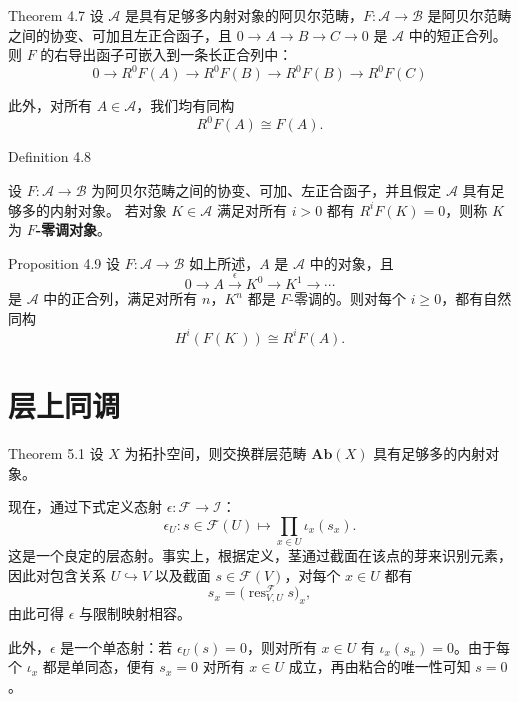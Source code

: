 \documentclass{beamer}
\begin{document}
\begin{frame}
\begin{block}{Theorem 4.7}
设 $\mathcal{A}$ 是具有足够多内射对象的阿贝尔范畴，$F: \mathcal{A} \to \mathcal{B}$ 是阿贝尔范畴之间的协变、可加且左正合函子，且 $0 \to A \to B \to C \to 0$ 是 $\mathcal{A}$ 中的短正合列。则 $F$ 的右导出函子可嵌入到一条长正合列中：
\[
0 \to R^{0} F(A) \to R^{0} F(B) \to R^{0} F(B) \to R^{0} F(C) \tag{6.12}
\]

此外，对所有 $A\in\mathcal{A}$，我们均有同构
\[
R^{0}F(A)\cong F(A).
\]
\end{block}
\end{frame}

\begin{frame}
\begin{block}{Definition 4.8}

设 $F\colon \mathcal{A}\to\mathcal{B}$ 为阿贝尔范畴之间的协变、可加、左正合函子，并且假定 $\mathcal{A}$ 具有足够多的内射对象。
若对象 $K\in\mathcal{A}$ 满足对所有 $i>0$ 都有 $R^iF(K)=0$，则称 $K$ 为 \textbf{$F$-零调对象}。

\end{block}

\begin{block}{Proposition 4.9}
设 $F:\mathcal{A}\to\mathcal{B}$ 如上所述，$A$ 是 $\mathcal{A}$ 中的对象，且
\[
0 \to A \stackrel{\epsilon}{\to} K^{0} \to K^{1} \to \cdots
\]
是 $\mathcal{A}$ 中的正合列，满足对所有 $n$，$K^{n}$ 都是 $F$-零调的。则对每个 $i\ge0$，都有自然同构
\[
H^{i}(F(K^{\cdot})) \cong R^{i}F(A).
\]
\end{block}
\end{frame}

\section{层上同调}

\begin{frame}
\begin{block}{Theorem 5.1}
设 $X$ 为拓扑空间，则交换群层范畴 $\mathbf{Ab}(X)$ 具有足够多的内射对象。

\end{block}
\end{frame}

\begin{frame}
现在，通过下式定义态射 $\epsilon: \mathcal{F} \to \mathcal{I}$：
\[
\epsilon_U: s\in\mathcal{F}(U) \longmapsto \prod_{x\in U}\iota_x(s_x).
\]
这是一个良定的层态射。事实上，根据定义，茎通过截面在该点的芽来识别元素，因此对包含关系 $U\hookrightarrow V$ 以及截面 $s\in\mathcal{F}(V)$，对每个 $x\in U$ 都有
\[
s_x = \big(\operatorname{res}_{V,U}^{\mathcal{F}}s\big)_x,
\]
由此可得 $\epsilon$ 与限制映射相容。

此外，$\epsilon$ 是一个单态射：若 $\epsilon_U(s)=0$，则对所有 $x\in U$ 有 $\iota_x(s_x)=0$。由于每个 $\iota_x$ 都是单同态，便有 $s_x=0$ 对所有 $x\in U$ 成立，再由粘合的唯一性可知 $s=0$。
\end{frame}
\end{document}
